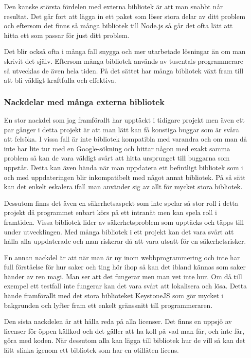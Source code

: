 Den kanske största fördelen med externa bibliotek är att man snabbt når resultat. Det går fort att lägga in ett paket som löser stora delar av ditt problem och eftersom det finns så många bibliotek till Node.js så går det ofta lätt att hitta ett som passar för just ditt problem.

Det blir också ofta i många fall snygga och mer utarbetade lösningar än om man skrivit det själv. Eftersom många bibliotek används av tusentals programmerare så utvecklas de även hela tiden. På det sättet har många bibliotek växt fram till att bli väldigt kraftfulla och effektiva. 

\subsubsection{Nackdelar med många externa bibliotek}

En stor nackdel som jag framförallt har upptäckt i tidigare projekt men även ett par gånger i detta projekt är att man lätt kan få konstiga buggar som är svåra att felsöka. I vissa fall är inte bibliotek kompatibla med varandra och om man då inte har lite tur med en Google-sökning och hittar någon med exakt samma problem så kan de vara väldigt svårt att hitta ursprunget till buggarna som uppstår. Detta kan även hända när man uppdatera ett befintligt bibliotek som i och med uppdateringen blir inkompatibelt med något annat bibliotek. På så sätt kan det enkelt eskalera ifall man använder sig av allt för mycket stora bibliotek.

Dessutom finns det även en säkerhetsaspekt som inte spelar så stor roll i detta projekt då programmet enbart körs på ett intranät men kan spela roll i framtiden. Vissa bibliotek lider av säkerhetsproblem som upptäcks och täpps till under utvecklingen. Med många bibliotek i ett projekt kan det vara svårt att hålla alla uppdaterade och man riskerar då att vara utsatt för en säkerhetsrisker.

En annan nackdel är att när man är ny inom webbprogrammering och inte har full förståelse för hur saker och ting hör ihop så kan det ibland kännas som saker händer av ren magi. Man ser att det fungerar men man vet inte hur. Om då till exempel ett testfall inte fungerar kan det vara svårt att lokalisera och lösa. Detta hände framförallt med det stora biblioteket KeystoneJS som gör mycket i bakgrunden och lyfter fram ett enkelt gränssnitt till programmeraren.

Den sista nackdelen är att hålla reda på alla licenser. Det finns en uppsjö av licenser för öppen källkod och det gäller att ha koll på vad man får, och inte får, göra med koden. När dessutom alla kan lägga till bibliotek hur de vill så kan det lätt slinka igenom ett bibliotek som har en otillåten licens.


